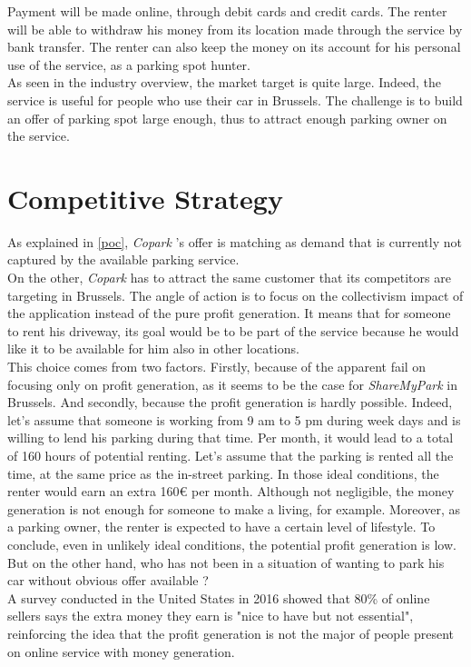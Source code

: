 \documentclass[12pt,a4paper,oneside]{book}
\newcommand{\bp}{\textit{Copark }}
\begin{document}
Payment will be made online, through debit cards and credit cards. The renter will be able to withdraw his money from its location made through the service by bank transfer. The renter can also keep the money on its account for his personal use of the service, as a parking spot hunter.\\

As seen in the industry overview, the market target is quite large. Indeed, the service is useful for people who use their car in Brussels. The challenge is to build an offer of parking spot large enough, thus to attract enough parking owner on the service.

\section{Competitive Strategy}
\label{cst}
As explained in \autoref{poc}, \bp's offer is matching as demand that is currently not captured by the available parking service.\\

On the other, \bp has to attract the same customer that its competitors are targeting in Brussels. The angle of action is to focus on the collectivism impact of the application instead of the pure profit generation. It means that for someone to rent his driveway, its goal would be to be part of the service because he would like it to be available for him also in other locations.\\
This choice comes from two factors. Firstly, because of the apparent fail on focusing only on profit generation, as it seems to be the case for \textit{ShareMyPark} in Brussels. And secondly, because the profit generation is hardly possible. Indeed, let's assume that someone is working from 9 am to 5 pm during week days and is willing to lend his parking during that time. Per month, it would lead to a total of 160 hours of potential renting. Let's assume that the parking is rented all the time, at the same price as the in-street parking. In those ideal conditions, the renter would earn an extra 160\euro{}  per month. Although not negligible, the money generation is not enough for someone to make a living, for example. Moreover, as a parking owner, the renter is expected to have a certain level of lifestyle. To conclude, even in unlikely ideal conditions, the potential profit generation is low. But on the other hand, who has not been in a situation of wanting to park his car without obvious offer available ?\\
A survey conducted in the United States in 2016 showed that 80\% of online sellers says the extra money they earn is "nice to have but not essential"\cite{ospg}, reinforcing the idea that the profit generation is not the major of people present on online service with money generation.
\end{document}
